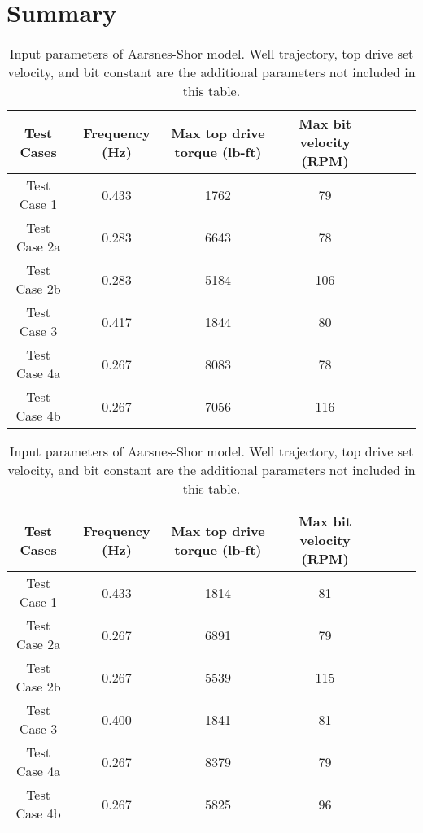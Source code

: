 \section{Summary} 
\begin{table}
    \centering
    \begin{tabular}{|c|c|c|c|c|c|c|}
        \hline
        \textbf{Test Cases} & \textbf{Frequency (Hz)} & \textbf{Max top drive torque (lb-ft)} & \textbf{Max bit velocity (RPM)}\\
        \hline
        Test Case 1 & 0.433 & 1762 & 79\\
        \hline
        Test Case 2a & 0.283 & 6643 & 78\\
        \hline
        Test Case 2b & 0.283 & 5184 & 106\\ 
        \hline
        Test Case 3 & 0.417 & 1844 & 80 \\                                                  
        \hline
        Test Case 4a & 0.267 & 8083 & 78 \\                                                   
        \hline
        Test Case 4b & 0.267 & 7056 & 116\\                                                       
        \hline
    \end{tabular}
    \caption[Input parameters of Aarsnes-Shor model (Python ver.)]{Input parameters of Aarsnes-Shor model. Well trajectory, top drive set velocity, and bit constant are the additional parameters not included in this table.}
    \label{AS_input_params}
\end{table} 

\begin{table}
    \centering
    \begin{tabular}{|c|c|c|c|c|c|c|}
        \hline
        \textbf{Test Cases} & \textbf{Frequency (Hz)} & \textbf{Max top drive torque (lb-ft)} & \textbf{Max bit velocity (RPM)}\\
        \hline
        Test Case 1  & 0.433 & 1814 & 81\\
        \hline
        Test Case 2a  & 0.267 & 6891 & 79\\
        \hline
        Test Case 2b  & 0.267 & 5539 & 115\\ 
        \hline
        Test Case 3  & 0.400 & 1841 & 81\\                                                  
        \hline
        Test Case 4a  & 0.267 & 8379 & 79\\                                                   
        \hline
        Test Case 4b & 0.267 & 5825 & 96\\                                                       
        \hline
    \end{tabular}
    \caption[Input parameters of Aarsnes-Shor model (Python ver.)]{Input parameters of Aarsnes-Shor model. Well trajectory, top drive set velocity, and bit constant are the additional parameters not included in this table.}
    \label{AS_input_params}
\end{table}